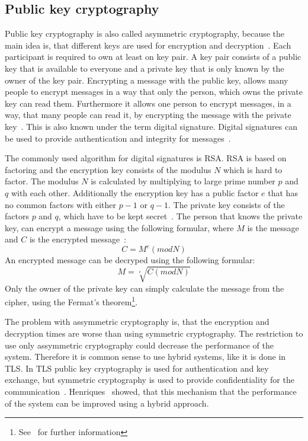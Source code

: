 \subsection{Public key cryptography}
Public key cryptography is also called asymmetric cryptography, because the main idea is, that different keys are used for encryption and decryption~\cite{anderson2020security}.
Each participant is required to own at least on key pair.
A key pair consists of a public key that is available to everyone and a private key that is only known by the owner of the key pair.
Encrypting a message with the public key, allows many people to encrypt messages in a way that only the person, which owns the private key can read them.
Furthermore it allows one person to encrypt messages, in a way, that many people can read it, by encrypting the message with the private key~\cite{henriques2017using}.
This is also known under the term digital signature. 
Digital signatures can be used to provide authentication and integrity for messages~\cite{anderson2020security}.

The commonly used algorithm for digital signatures is RSA.
RSA is based on factoring and the encryption key consists of the modulus $N$ which is hard to factor.
The modulus $N$ is calculated by multiplying to large prime number $p$ and $q$ with each other.
Additionally the encryption key has a public factor $e$ that has no common factors with either $p-1$ or $q-1$.
The private key consists of the factors $p$ and $q$, which have to be kept secret~\cite{anderson2020security}.
The person that knows the private key, can encrypt a message using the following formular, where $M$ is the message and $C$ is the encrypted message~\cite{anderson2020security}:
\begin{displaymath}
	C = M^e (mod N)
\end{displaymath}
An encrypted message can be decryped using the following formular:
\begin{displaymath}
	M = \sqrt[e]{C (mod N)}
\end{displaymath}
Only the owner of the private key can simply calculate the message from the cipher, using the Fermat's theorem\footnote{See~\cite{anderson2020security} for further information}.

The problem with assymmetric cryptography is, that the encryption and decryption times are worse than using symmetric cryptography.
The restriction to use only assymmetric cryptography could decrease the performance of the system.
Therefore it is common sense to use hybrid systems, like it is done in TLS.
In TLS public key cryptography is used for authentication and key exchange, but symmetric cryptography is used to provide confidentiality for the communication~\cite{henriques2017using}.
Henriques~\cite{henriques2017using} showed, that this mechanism that the performance of the system can be improved using a hybrid approach.

